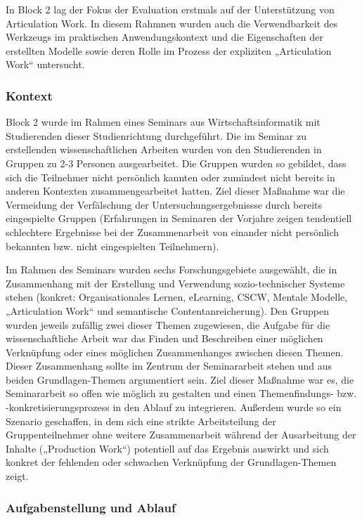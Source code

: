 In Block 2 lag der Fokus der Evaluation erstmals auf der Unterstützung von Articulation Work. In diesem Rahmnen wurden auch die Verwendbarkeit des Werkzeugs im praktischen Anwendungskontext und die Eigenschaften der erstellten Modelle sowie deren Rolle im Prozess der expliziten „Articulation Work“ untersucht.

\subsubsection{Kontext} %
\label{ssub:2_kontext}

Block 2 wurde im Rahmen eines Seminars aus Wirtschaftsinformatik mit Studierenden dieser Studienrichtung durchgeführt. Die im Seminar zu erstellenden wissenschaftlichen Arbeiten wurden von den Studierenden in Gruppen zu 2-3 Personen ausgearbeitet. Die Gruppen wurden so gebildet, dass sich die Teilnehmer nicht persönlich kannten oder zumindest nicht bereits in anderen Kontexten zusammengearbeitet hatten. Ziel dieser Maßnahme war die Vermeidung der Verfälschung der Untersuchungsergebnissse durch bereits eingespielte Gruppen (Erfahrungen in Seminaren der Vorjahre zeigen tendentiell schlechtere Ergebnisse bei der Zusammenarbeit von einander nicht persönlich bekannten bzw. nicht eingespielten Teilnehmern).

Im Rahmen des Seminars wurden sechs Forschungsgebiete ausgewählt, die in Zusammenhang mit der Erstellung und Verwendung sozio-technischer Systeme stehen (konkret: Organisationales Lernen, eLearning, \gls{CSCW}, Mentale Modelle, „Articulation Work“ und semantische Contentanreicherung). Den Gruppen wurden jeweils zufällig zwei dieser Themen zugewiesen, die Aufgabe für die wissenschaftliche Arbeit war das Finden und Beschreiben einer möglichen Verknüpfung oder eines möglichen Zusammenhanges zwischen diesen Themen. Dieser Zusammenhang sollte im Zentrum der Seminararbeit stehen und aus beiden Grundlagen-Themen argumentiert sein. Ziel dieser Maßnahme war es, die Seminararbeit so offen wie möglich zu gestalten und einen Themenfindungs- bzw. -konkretisierungsprozess in den Ablauf zu integrieren. Außerdem wurde so ein Szenario geschaffen, in dem sich eine strikte Arbeitsteilung der Gruppenteilnehmer ohne weitere Zusammenarbeit während der Ausarbeitung der Inhalte („Production Work“) potentiell auf das Ergebnis auswirkt und sich konkret der fehlenden oder schwachen Verknüpfung der Grundlagen-Themen zeigt.


\subsubsection{Aufgabenstellung und Ablauf} %
\label{ssub:2_aufgabenstellung}


